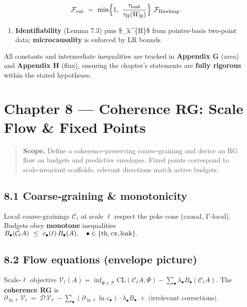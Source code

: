 \documentclass[
]{article}
\providecommand{\tightlist}{%
  \setlength{\itemsep}{0pt}\setlength{\parskip}{0pt}}
\numberwithin{equation}{section}
\begin{document}
\[
\mathcal F_{\rm out}\ =\ \min\!\Big\{1,\ \frac{\tau_{\rm leak}}{\tau_{\rm H}(W_{\rm H})}\Big\}\ \mathcal F_{\rm Hawking}.
\]

\begin{enumerate}
\def\labelenumi{\arabic{enumi}.}
\setcounter{enumi}{5}
\tightlist
\item
  \textbf{Identifiability} (Lemma 7.3) pins \$\Gamma\_k\^{}\{\rm H\}\$
  from pointer-basis two-point data; \textbf{microcausality} is enforced
  by LR bounds.
\end{enumerate}

All constants and intermediate inequalities are tracked in
\textbf{Appendix G} (area) and \textbf{Appendix H} (flux), ensuring the
chapter's statements are \textbf{fully rigorous} within the stated
hypotheses.

\hypertarget{chapter-8-coherence-rg-scale-flow-fixed-points}{%
\section{Chapter 8 --- Coherence RG: Scale Flow \& Fixed
Points}\label{chapter-8-coherence-rg-scale-flow-fixed-points}}

\begin{quote}
\textbf{Scope.} Define a coherence‑preserving coarse‑graining and derive
an RG flow on budgets and predictive envelopes. Fixed points correspond
to scale‑invariant scaffolds; relevant directions match active budgets.
\end{quote}

\hypertarget{coarsegraining-monotonicity}{%
\subsection{8.1 Coarse‑graining \&
monotonicity}\label{coarsegraining-monotonicity}}

Local coarse‑grainings \(\mathcal C_\ell\) at scale \(\ell\) respect the
poke cone (causal, Γ‑local). Budgets obey \textbf{monotone} inequalities
\(B_\bullet(\mathcal C_\ell A)\ \le\ c_\bullet(\ell)\, B_\bullet(A),\quad \bullet\in\{\rm th,cx,leak\}.\)

\hypertarget{flow-equations-envelope-picture}{%
\subsection{8.2 Flow equations (envelope
picture)}\label{flow-equations-envelope-picture}}

Scale‑\(\ell\) objective
\(\mathcal V_\ell(A)= \inf_{\Phi\in\overline{\mathcal P}}\mathrm{CL}(\mathcal C_\ell A,\Phi) - \sum_\bullet \lambda_\bullet B_\bullet(\mathcal C_\ell A)\).
The \textbf{coherence RG} is
\(\partial_{\ln\ell}\, \mathcal V_\ell\ =\ \mathcal D\,\mathcal V_\ell\ -\sum_\bullet (\partial_{\ln\ell}\ln c_\bullet)\cdot \lambda_\bullet B_\bullet\ +\ \text{(irrelevant corrections)}.\)
\end{document}
